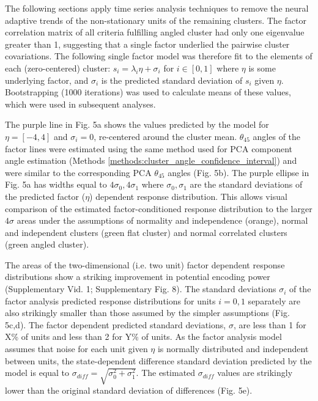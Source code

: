 \documentclass{article}
\begin{document}
 The following sections apply time series analysis techniques to remove the neural adaptive trends of the non-stationary units of the remaining clusters. The factor correlation matrix of all criteria fulfilling angled cluster had only one eigenvalue greater than 1, suggesting that a single factor underlied the pairwise cluster covariations. The following single factor model was therefore fit to the elements of each (zero-centered) cluster: $s_i = \lambda_i \eta + \sigma_i$ for $i \in [0, 1]$ 
where $\eta$ is some underlying factor, 
and $\sigma_i$ is the predicted standard deviation of $s_i$ given $\eta$. Bootstrapping (1000 iterations) was used to calculate means of these values, which were used in subsequent analyses.

The purple line in Fig. 5a shows the values predicted by the model for $\eta = [-4, 4]$ and $\sigma_i = 0$, re-centered around the cluster mean. $\theta_{45}$ angles of the factor lines were estimated using the same method used for PCA component angle estimation (Methods \ref{methods:cluster_angle_confidence_interval}) and were similar to the corresponding PCA $\theta_{45}$ angles (Fig. 5b). The purple ellipse in Fig. 5a has widths equal to $4\sigma_0, 4\sigma_1$ where  $\sigma_0, \sigma_1$ are the standard deviations of the predicted factor ($\eta$) dependent response distribution. This allows visual comparison of the estimated factor-conditioned response distribution to the larger $4\sigma$ areas under the assumptions of normality and independence (orange), normal and independent clusters (green flat cluster) and normal correlated clusters (green angled cluster). 

The areas of the two-dimensional (i.e. two unit) factor dependent response distributions show a striking improvement in potential encoding power (Supplementary Vid. 1; Supplementary Fig. 8). The standard deviations $\sigma_i$ of the factor analysis predicted response distributions for units $i = 0,1$ separately are also strikingly smaller than those assumed by the simpler assumptions (Fig. 5c,d). The factor dependent predicted standard deviations, $\sigma$, are less than 1 for X\% of units and less than 2 for Y\% of units. 
As the factor analysis model assumes that noise for each unit given $\eta$ is normally distributed and independent between units, the state-dependent difference standard deviation predicted by the model is equal to \(\sigma_{diff} = \sqrt{\sigma_{0}^2 + \sigma_{1}^2}\).
The estimated $\sigma_{diff}$ values are strikingly lower than the original standard deviation of differences (Fig. 5e). 
\end{document}
